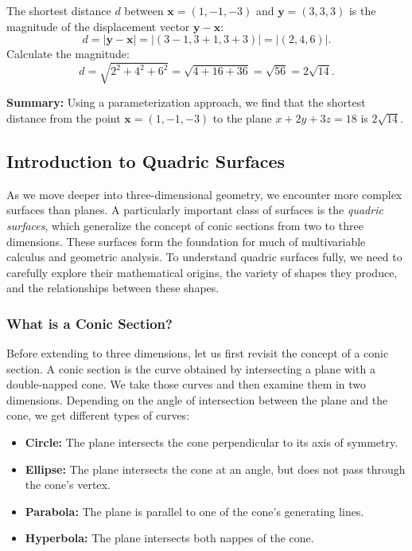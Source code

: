 \begin{example}
\begin{solution}
\begin{enumerate}
    \noindent The shortest distance \( d \) between \( \mathbf{x} = (1, -1, -3) \) and \( \mathbf{y} = (3, 3, 3) \) is the magnitude of the displacement vector \( \mathbf{y} - \mathbf{x} \):
    \[
    d = |\mathbf{y} - \mathbf{x}| = |(3 - 1, 3 + 1, 3 + 3)| = |(2, 4, 6)|.
    \]
    Calculate the magnitude:
    \[
    d = \sqrt{2^2 + 4^2 + 6^2} = \sqrt{4 + 16 + 36} = \sqrt{56} = 2 \sqrt{14}.
    \]
\end{enumerate}

\noindent \textbf{Summary:} Using a parameterization approach, we find that the shortest distance from the point \( \mathbf{x} = (1, -1, -3) \) to the plane \( x + 2y + 3z = 18 \) is \( 2 \sqrt{14} \).

\end{solution}
\end{example}
\exampleline


\newpage




 


\subsection*{Introduction to Quadric Surfaces}

\noindent As we move deeper into three-dimensional geometry, we encounter more complex surfaces than planes. A particularly important class of surfaces is the \textit{quadric surfaces}, which generalize the concept of conic sections from two to three dimensions. These surfaces form the foundation for much of multivariable calculus and geometric analysis. To understand quadric surfaces fully, we need to carefully explore their mathematical origins, the variety of shapes they produce, and the relationships between these shapes.

\subsubsection*{What is a Conic Section?}

\noindent Before extending to three dimensions, let us first revisit the concept of a conic section. A conic section is the curve obtained by intersecting a plane with a double-napped cone. We take those curves and then examine them in two dimensions. Depending on the angle of intersection between the plane and the cone, we get different types of curves:
\begin{itemize}
    \item \textbf{Circle:} The plane intersects the cone perpendicular to its axis of symmetry.
    \item \textbf{Ellipse:} The plane intersects the cone at an angle, but does not pass through the cone's vertex.
    \item \textbf{Parabola:} The plane is parallel to one of the cone's generating lines.
    \item \textbf{Hyperbola:} The plane intersects both nappes of the cone.
\end{itemize}



